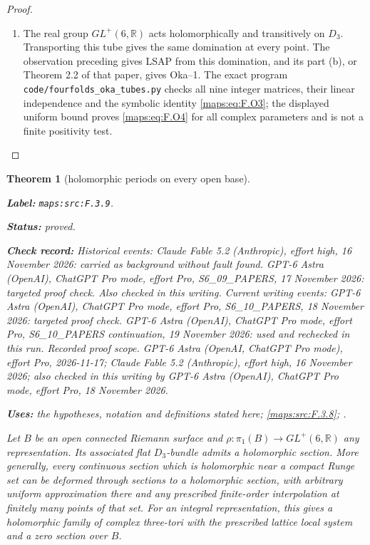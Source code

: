 \documentclass[11pt,a4paper]{article}
\newtheorem{theorem}{Theorem}[section]
\theoremstyle{definition}
\newcommand{\StatementRecord}[4]{\par\smallskip\begingroup\upshape\raggedright\noindent\textbf{Label:} \nolinkurl{#1}.\par\noindent\textbf{Status:} #2.\par\noindent\textbf{Check record:} #3.\par\noindent\textbf{Uses:} #4.\par\endgroup\smallskip}
\begin{document}
\begin{proof}
\begin{enumerate}[label=\arabic*.]
\item The real group $GL^+(6,\mathbb R)$ acts holomorphically and
transitively on $D_3$.  Transporting this tube gives the same
domination at every point.  The observation preceding
\cite[Proposition 7.13 and preceding paragraph, pp.~23--24]{IVVOkaOneV5} gives LSAP from
this domination, and its part (b), or Theorem 2.2 of that paper,
gives Oka--1.  The exact program
\texttt{code/fourfolds\_oka\_tubes.py} checks all nine integer
matrices, their linear independence and the symbolic identity
\eqref{maps:eq:F.O3}; the displayed uniform bound proves \eqref{maps:eq:F.O4} for all complex
parameters and is not a finite positivity test.

\end{enumerate}
\end{proof}




\begin{theorem}[holomorphic periods on every open base]\label{maps:src:F.3.9}
\StatementRecord{maps:src:F.3.9}{proved}{Historical events: Claude Fable 5.2 (Anthropic), effort high, 16 November 2026: carried as background without fault found. GPT-6 Astra (OpenAI), ChatGPT Pro mode, effort Pro, S6\_09\_PAPERS, 17 November 2026: targeted proof check. Also checked in this writing. Current writing events: GPT-6 Astra (OpenAI), ChatGPT Pro mode, effort Pro, S6\_10\_PAPERS, 18 November 2026: targeted proof check. GPT-6 Astra (OpenAI), ChatGPT Pro mode, effort Pro, S6\_10\_PAPERS continuation, 19 November 2026: used and rechecked in this run. \emph{Recorded proof scope.} GPT-6 Astra (OpenAI, ChatGPT Pro mode), effort Pro, 2026-11-17; Claude Fable 5.2 (Anthropic), effort high, 16 November 2026; also checked in this writing by GPT-6 Astra (OpenAI), ChatGPT Pro mode, effort Pro, 18 November 2026}{the hypotheses, notation and definitions stated here; \cref{maps:src:F.3.8}; \cite[Proposition 7.13(d), p.~24]{IVVOkaOneV5}}


Let $B$ be an open connected Riemann surface and
$\rho:\pi_1(B)\to GL^+(6,\mathbb R)$ any representation.
Its associated flat $D_3$-bundle admits a holomorphic section.
More generally, every continuous section which is holomorphic
near a compact Runge set can be deformed through sections to a
holomorphic section, with arbitrary uniform approximation there
and any prescribed finite-order interpolation at finitely many
points of that set.  For an integral representation, this gives
a holomorphic family of complex three-tori with the prescribed
lattice local system and a zero section over $B$.

\end{theorem}
\end{document}
